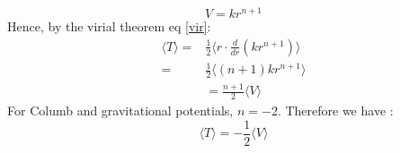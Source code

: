  \begin{equation}
 V = k r ^{n+1}
 \end{equation}
 Hence, by the virial theorem eq \eqref{vir}:
 \begin{align}
  \langle T \rangle= & \frac{1}{2} \langle   r \cdot  \frac{d}{d r} (k r ^{n+1} ) \rangle \\ \nonumber
  =& \frac{1}{2}\langle (n+1) k r^{n+1}\rangle \\ \nonumber
  &= \frac{n+1}{2}\langle V \rangle
 \end{align}
 For Columb and gravitational potentials, $ n =-2$. Therefore we have :
 \begin{equation}
 \langle T \rangle= - \frac{1}{2}\langle V \rangle
 \end{equation}
